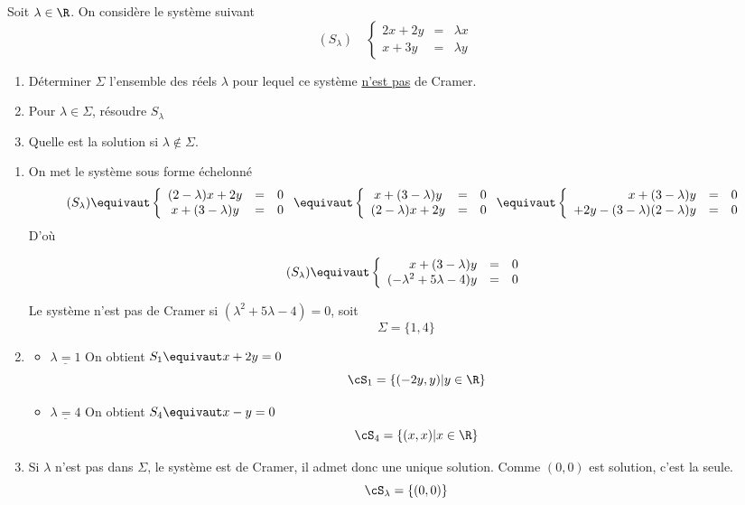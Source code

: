 



\begin{exercice}
Soit $\lambda \in \R$. On considère le système suivant 
$$(S_\lambda)\quad  \left\{ \begin{array}{ccc}
2x +2y & =& \lambda x\\
x +3y  & =& \lambda y 
\end{array}\right. $$

\begin{enumerate}
\item Déterminer $\Sigma$ l'ensemble des réels $\lambda$ pour lequel ce système \underline{n'est pas} de Cramer. 
\item Pour $\lambda \in \Sigma$, résoudre $S_\lambda$
\item Quelle est la solution si $\lambda \notin \Sigma$. 
\end{enumerate}
\end{exercice}

\begin{correction}
\begin{enumerate}
\item  On met le système sous forme échelonné
$$(S_\lambda)\equivaut  \left\{ \begin{array}{ccc}
(2-\lambda)x +2y & =& 0\\
x +(3-\lambda)y  & =& 0
\end{array}\right.
\equivaut 
\left\{ \begin{array}{ccc}
x +(3-\lambda)y  & =& 0\\
(2-\lambda)x +2y & =& 0
\end{array}\right.
\equivaut 
\left\{ \begin{array}{rcc}
x +(3-\lambda)y  & =& 0\\
+2y -  (3-\lambda) (2-\lambda) y& =& 0
\end{array}\right.
 $$
 D'où 
 
 $$(S_\lambda)\equivaut  \left\{ \begin{array}{rcc}
x +(3-\lambda)y  & =& 0\\
  (-\lambda^2 +5\lambda -4) y& =& 0
\end{array}\right.$$
 
Le système n'est pas de Cramer si  $ (\lambda^2 +5\lambda -4) =0$, soit 
$$\Sigma =\{ 1, 4\}$$
\item \begin{itemize}
\item $\underline{\lambda=1}$
On obtient $S_1 \equivaut x+ 2y =0$
$$\cS_1 =\{ (-2y, y) | y \in \R\}$$

\item $\underline{\lambda=4}$
On obtient $S_4 \equivaut x-y =0$
$$\cS_4 =\{ (x, x) | x \in \R\}$$
\end{itemize}

\item Si $\lambda$ n'est pas dans $ \Sigma$, le système est de Cramer, il admet donc une unique solution. Comme $(0,0)$ est solution, c'est la seule. 
$$\cS_\lambda =\{ (0,0)\}$$
\end{enumerate}
\end{correction}